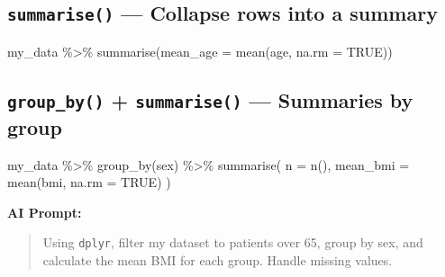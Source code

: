 \documentclass[
  letterpaper,
  DIV=11,
  numbers=noendperiod,
  oneside]{scrreprt}
\newenvironment{Shaded}{\begin{snugshade}}{\end{snugshade}}
\newcommand{\AttributeTok}[1]{\textcolor[rgb]{0.40,0.45,0.13}{#1}}
\newcommand{\ConstantTok}[1]{\textcolor[rgb]{0.56,0.35,0.01}{#1}}
\newcommand{\FunctionTok}[1]{\textcolor[rgb]{0.28,0.35,0.67}{#1}}
\newcommand{\NormalTok}[1]{\textcolor[rgb]{0.00,0.23,0.31}{#1}}
\newcommand{\SpecialCharTok}[1]{\textcolor[rgb]{0.37,0.37,0.37}{#1}}
\begin{document}
\subsection*{\texorpdfstring{\texttt{summarise()} --- Collapse rows into
a
summary}{summarise() --- Collapse rows into a summary}}\label{summarise-collapse-rows-into-a-summary}

\begin{Shaded}
\begin{Highlighting}[numbers=left,,]
\NormalTok{my\_data }\SpecialCharTok{\%\textgreater{}\%} \FunctionTok{summarise}\NormalTok{(}\AttributeTok{mean\_age =} \FunctionTok{mean}\NormalTok{(age, }\AttributeTok{na.rm =} \ConstantTok{TRUE}\NormalTok{))}
\end{Highlighting}
\end{Shaded}

\subsection*{\texorpdfstring{\texttt{group\_by()} + \texttt{summarise()}
--- Summaries by
group}{group\_by() + summarise() --- Summaries by group}}\label{group_by-summarise-summaries-by-group}

\begin{Shaded}
\begin{Highlighting}[numbers=left,,]
\NormalTok{my\_data }\SpecialCharTok{\%\textgreater{}\%}
  \FunctionTok{group\_by}\NormalTok{(sex) }\SpecialCharTok{\%\textgreater{}\%}
  \FunctionTok{summarise}\NormalTok{(}
    \AttributeTok{n =} \FunctionTok{n}\NormalTok{(),}
    \AttributeTok{mean\_bmi =} \FunctionTok{mean}\NormalTok{(bmi, }\AttributeTok{na.rm =} \ConstantTok{TRUE}\NormalTok{)}
\NormalTok{  )}
\end{Highlighting}
\end{Shaded}

\textbf{AI Prompt:}

\begin{quote}
Using \texttt{dplyr}, filter my dataset to patients over 65, group by
sex, and calculate the mean BMI for each group. Handle missing values.
\end{quote}
\end{document}
